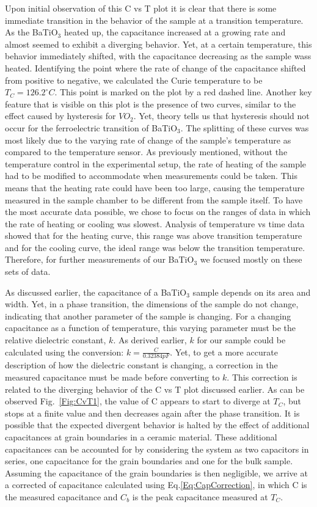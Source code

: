\documentclass[%
 reprint,
 amsmath,amssymb,
 aps,
 pra,
]{revtex4-1}
\begin{document}
Upon initial observation of this C vs T plot it is clear that there is some immediate transition in the behavior of the sample at a transition temperature. As the BaTiO$_{3}$ heated up, the capacitance increased at a growing rate and almost seemed to exhibit a diverging behavior. Yet, at a certain temperature, this behavior immediately shifted, with the capacitance decreasing as the sample wass heated. Identifying the point where the rate of change of the capacitance shifted from positive to negative, we calculated the Curie temperature to be $T_{C} = 126.2^\circ C$. This point is marked on the plot by a red dashed line. Another key feature that is visible on this plot is the presence of two curves, similar to the effect caused by hysteresis for $VO_{2}$. Yet, theory tells us that hysteresis should not occur for the ferroelectric transition of BaTiO$_{3}$. The splitting of these curves was most likely due to the varying rate of change of the sample's temperature as compared to the temperature sensor. As previously mentioned, without the temperature control in the experimental setup, the rate of heating of the sample had to be modified to accommodate when measurements could be taken. This means that the heating rate could have been too large, causing the temperature measured in the sample chamber to be different from the sample itself. To have the most accurate data possible, we chose to focus on the ranges of data in which the rate of heating or cooling was slowest. Analysis of temperature vs time data showed that for the heating curve, this range was above transition temperature and for the cooling curve, the ideal range was below the transition temperature. Therefore, for further measurements of our BaTiO$_{3}$ we focused mostly on these sets of data.

As discussed earlier, the capacitance of a BaTiO$_{3}$ sample depends on its area and width. Yet, in a phase transition, the dimensions of the sample do not change, indicating that another parameter of the sample is changing. For a changing capacitance as a function of temperature, this varying parameter must be the relative dielectric constant, $k$. As derived earlier, $k$ for our sample could be calculated using the conversion: $k = \frac{C}{0.32384 pF}$. Yet, to get a more accurate description of how the dielectric constant is changing, a correction in the measured capacitance must be made before converting to $k$. This correction is related to the diverging behavior of the C vs T plot discussed earlier. As can be observed Fig.~\ref{Fig:CvT1}, the value of C appears to start to diverge at $T_{C}$, but stops at a finite value and then decreases again after the phase transition. It is possible that the expected divergent behavior is halted by the effect of additional capacitances at grain boundaries in a ceramic material. These additional capacitances can be accounted for by considering the system as two capacitors in series, one capacitance for the grain boundaries and one for the bulk sample. Assuming the capacitance of the grain boundaries is then negligible, we arrive at a corrected of capacitance calculated using Eq.\ref{Eq:CapCorrection}, in which C is the measured capacitance and $C_{b}$ is the peak capacitance measured at $T_{C}$.
\end{document}
